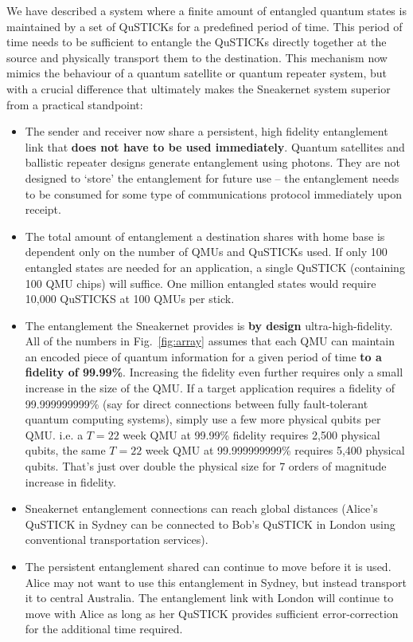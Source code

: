 \documentclass[twocolumn, aps, rmp, amsmath, amssymb, nofootinbib, superscriptaddress, longbibliography, floatfix, table-of-contents, eqsecnum]{revtex4-2}
\begin{document}
We have described a system where a finite amount of entangled quantum states is maintained by a set of QuSTICKs for a predefined period of time. This period of time needs to be sufficient to entangle the QuSTICKs directly together at the source and physically transport them to the destination. This mechanism now mimics the behaviour of a quantum satellite or quantum repeater system, but with a crucial difference that ultimately makes the Sneakernet system superior from a practical standpoint:
\begin{itemize}
\item The sender and receiver now share a persistent, high fidelity entanglement link that \textbf{does not have to be used immediately}. Quantum satellites and ballistic repeater designs generate entanglement using photons. They are not designed to `store' the entanglement for future use -- the entanglement needs to be consumed for some type of communications protocol immediately upon receipt.
\item The total amount of entanglement a destination shares with home base is dependent only on the number of QMUs and QuSTICKs used. If only 100 entangled states are needed for an application, a single QuSTICK (containing 100 QMU chips) will suffice. One million entangled states would require 10,000 QuSTICKS at 100 QMUs per stick. 
\item The entanglement the Sneakernet provides is \textbf{by design} ultra-high-fidelity. All of the numbers in Fig.~\ref{fig:array} assumes that each QMU can maintain an encoded piece of quantum information for a given period of time \textbf{to a fidelity of 99.99\%}. Increasing the fidelity even further requires only a small increase in the size of the QMU. If a target application requires a fidelity of 99.999999999\% (say for direct connections between fully fault-tolerant quantum computing systems), simply use a few more physical qubits per QMU. i.e. a $T= 22$ week QMU at 99.99\% fidelity requires 2,500 physical qubits, the same $T=22$ week QMU at 99.999999999\% requires 5,400 physical qubits. That's just over double the physical size for 7 orders of magnitude increase in fidelity.
\item Sneakernet entanglement connections can reach global distances (Alice's QuSTICK in Sydney can be connected to Bob's QuSTICK in London using conventional transportation services).
\item The persistent entanglement shared can continue to move before it is used. Alice may not want to use this entanglement in Sydney, but instead transport it to central Australia. The entanglement link with London will continue to move with Alice as long as her QuSTICK provides sufficient error-correction for the additional time required.
\end{itemize}
\end{document}
